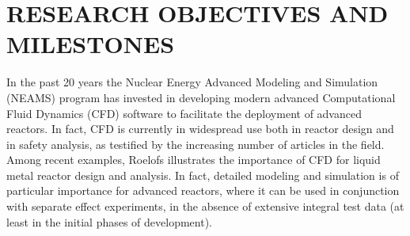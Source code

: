 \vspace{-.25in}
\section*{RESEARCH OBJECTIVES AND MILESTONES }  
\vspace{-.2in}

In the past 20 years the Nuclear Energy Advanced Modeling and Simulation (NEAMS) program \cite{sofu2017us} has invested in developing modern advanced Computational Fluid Dynamics (CFD) software to facilitate the deployment of advanced reactors. In fact, CFD is currently in widespread use both in reactor design and in safety analysis, as testified by the increasing number of articles in the field. Among recent examples, Roelofs \cite{roelofs2018thermal} illustrates the importance of CFD for liquid metal reactor design and analysis. In fact, detailed modeling and simulation is of particular importance for advanced reactors,  where it can be used in conjunction with separate effect experiments, in the absence of extensive integral test data (at least in the initial phases of development).

